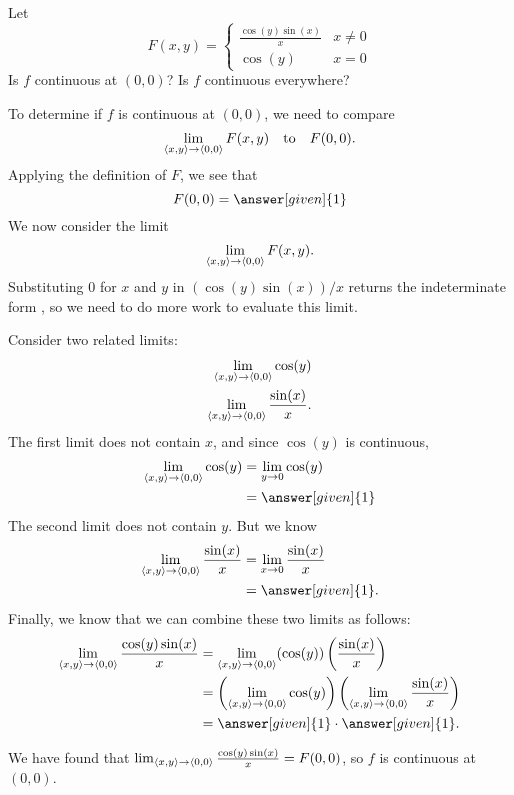 \documentclass{ximera}
\begin{document}
\begin{example}
  Let
  \[
  F(x,y) = \begin{cases}
    \frac{\cos(y)\sin(x)}{x} & x\neq 0 \\
    \cos(y) & x=0
  \end{cases}
  \]
  Is $f$ continuous at $(0,0)$? Is $f$ continuous everywhere?
  \begin{explanation}
    To determine if $f$ is continuous at $(0,0)$, we need to compare
    \[
    \lim_{\left\langle x,y\right\rangle\to\left\langle 0,0\right\rangle} F(x,y)\quad\text{to}\quad F(0,0).
    \]
    Applying the definition of $F$, we see that
    \[
    F(0,0) = \answer[given]{1}
    \]
    We now consider the limit
    \[
    \lim_{\left\langle x,y\right\rangle\to\left\langle 0,0\right\rangle}F(x,y).
    \]
    Substituting $0$ for $x$ and $y$ in $(\cos(y)\sin(x))/x$ returns the
    indeterminate form \zeroOverZero, so we need to do more work to
    evaluate this limit.
    
    Consider two related limits:
    \begin{align*}
      \lim_{\left\langle x,y\right\rangle\to\left\langle 0,0\right\rangle} \cos(y)\\
      \lim_{\left\langle x,y\right\rangle\to\left\langle 0,0\right\rangle} \frac{\sin(x)}{x}.
    \end{align*}
    The first limit does not contain $x$, and since $\cos(y)$ is
    continuous,
    \begin{align*}
    \lim_{\vector{x,y}\to\vector{0,0}} \cos(y) &=\lim_{y\to 0} \cos(y) \\
    &=\answer[given]{1}
    \end{align*}
    The second limit does not contain $y$. But we know
    \begin{align*}
      \lim_{\vector{x,y}\to\vector{0,0}} \frac{\sin(x)}{x} &= \lim_{x\to 0} \frac{\sin(x)}{x} \\
      &= \answer[given]{1}.
    \end{align*}
    Finally, we know that we can combine these two limits as follows:
    \begin{align*}
      \lim_{\vector{x,y}\to\vector{0,0}} \frac{\cos(y)\sin(x)}{x} &= \lim_{\vector{x,y}\to\vector{0,0}} (\cos(y))\left(\frac{\sin(x)}{x}\right) \\ 
      &=\left(\lim_{\vector{x,y}\to\vector{0,0}} \cos(y)\right)\left(\lim_{\vector{x,y}\to\vector{0,0}} \frac{\sin(x)}{x}\right) \\
      &=\answer[given]{1}\cdot \answer[given]{1}.
    \end{align*}
    
    We have found that $\lim_{\left\langle x,y\right\rangle\to\left\langle 0,0\right\rangle} \frac{\cos(y)\sin(x)}{x} =
    F(0,0)$, so $f$ is continuous at $(0,0)$.


\end{explanation}
\end{example}
\end{document}
